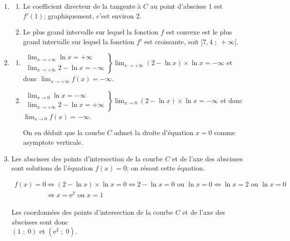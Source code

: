 \documentclass[10pt]{article}
\providecommand{\e}{{\mathrm{e}}}
\providecommand{\ds}{\displaystyle}
\begin{document}
\begin{enumerate}
	\item

	\begin{enumerate}
		\item Le coefficient directeur de la tangente à $C$ au point d'abscisse 1 est $f'(1)$; graphiquement, c'est environ 2.

		\item 	Le plus grand intervalle sur lequel la fonction $f$ est convexe est le plus grand intervalle sur lequel la fonction $f'$ est croissante, soit  $[7,4\;;\;+\infty[$.
	\end{enumerate}

	\item \begin{enumerate}
		\item 
$\left .\begin{array}{l}
\ds\lim _{x\to +\infty} \ln x = +\infty\\
\ds\lim _{x\to +\infty} 2-\ln x = -\infty
\end{array}		
\right \}
\ds\lim _{x\to +\infty} \left (2-\ln x\right )\times \ln x = -\infty$
et donc
$\ds\lim _{x\to +\infty} f(x) = -\infty$.

		\item
$\left .\begin{array}{l}
\ds\lim _{x\to 0} \ln x = -\infty\\
\ds\lim _{x\to +\infty} 2-\ln x = +\infty
\end{array}		
\right \}
\ds\lim _{x\to 0} \left (2-\ln x\right )\times \ln x = -\infty$
et donc
$\ds\lim _{x\to 0} f(x) = -\infty$.
		
On en déduit que la courbe $C$ admet la droite d'équation $x=0$ comme asymptote verticale.		
	\end{enumerate}

	\item 
Les abscisses des points d'intersection de la courbe $C$ et de l'axe des abscisses sont solutions de l'équation $f(x)=0$; on résout cette équation.

$\begin{gathered}f(x)=0
\iff
(2-\ln x)\times \ln x=0
\iff
2-\ln x = 0 \text{ ou }	\ln x = 0
\iff
\ln x = 2 \text{ ou } \ln x = 0\\
\phantom{f(x)=0}
\iff
x=\e^{2} \text{ ou } x=1\end{gathered}$

Les coordonnées des  points d'intersection de la courbe $C$ et de l'axe des abscisses sont donc \\$(1\;;\;0)$ et $(\e^{2}\;;\;0)$.


\end{enumerate}
\end{document}
